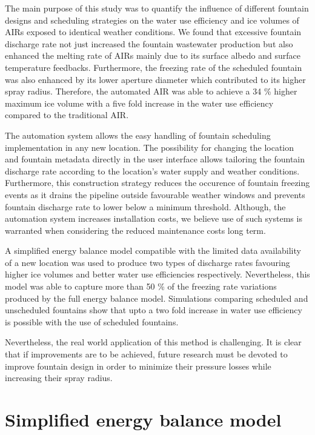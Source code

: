 \documentclass[tc, manuscript]{copernicus}
\begin{document}
The main purpose of this study was to quantify the influence of different fountain designs and scheduling
strategies on the water use efficiency and ice volumes of AIRs exposed to identical weather conditions. We found
that excessive fountain discharge rate not just increased the fountain wastewater production but also enhanced
the melting rate of AIRs mainly due to its surface albedo and surface temperature feedbacks. Furthermore, the
freezing rate of the scheduled fountain was also enhanced by its lower aperture diameter which contributed to
its higher spray radius. Therefore, the automated AIR was able to achieve a 34 \% higher maximum ice volume with
a five fold increase in the water use efficiency compared to the traditional AIR.

The automation system allows the easy handling of fountain scheduling implementation in any new location. The
possibility for changing the location and fountain metadata directly in the user interface allows tailoring the
fountain discharge rate according to the location's water supply and weather conditions. Furthermore, this
construction strategy reduces the occurence of fountain freezing events as it drains the pipeline outside
favourable weather windows and prevents fountain discharge rate to lower below a minimum threshold. Although,
the automation system increases installation costs, we believe use of such systems is warranted when considering
the reduced maintenance costs long term.

A simplified energy balance model compatible with the limited data availability of a new location was used to
produce two types of discharge rates favouring higher ice volumes and better water use efficiencies
respectively. Nevertheless, this model was able to capture more than 50 \% of the freezing rate variations
produced by the full energy balance model. Simulations comparing scheduled and unscheduled fountains show that
upto a two fold increase in water use efficiency is possible with the use of scheduled fountains.

Nevertheless, the real world application of this method is challenging. It is clear that if improvements are to
be achieved, future research must be devoted to improve fountain design in order to minimize their pressure
losses while increasing their spray radius.

\appendix

\section{Simplified energy balance model}
\end{document}

